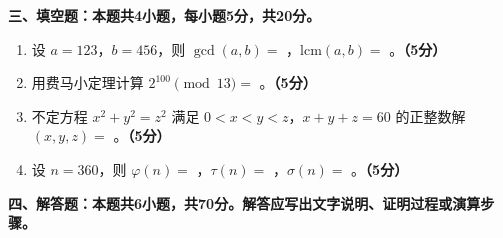 \documentclass[12pt, a4paper]{ctexart}
\newcommand{\score}[1]{\hfill\textbf{（#1分）}}
\begin{document}
\vspace{10pt}

{\large\bfseries 三、填空题：本题共4小题，每小题5分，共20分。}

\vspace{8pt}

\begin{enumerate}[resume]

\item 设 $a=123$，$b=456$，则 $\gcd(a,b)=$ \underline{\hspace{2cm}}，$\text{lcm}(a,b)=$ \underline{\hspace{2cm}}。\score{5}

\item 用费马小定理计算 $2^{100}\pmod{13}=$ \underline{\hspace{2cm}}。\score{5}

\item 不定方程 $x^2+y^2=z^2$ 满足 $0<x<y<z$，$x+y+z=60$ 的正整数解 $(x,y,z)=$ \underline{\hspace{2cm}}。\score{5}

\item 设 $n=360$，则 $\varphi(n)=$ \underline{\hspace{2cm}}，$\tau(n)=$ \underline{\hspace{2cm}}，$\sigma(n)=$ \underline{\hspace{2cm}}。\score{5}

\end{enumerate}

\vspace{10pt}

{\large\bfseries 四、解答题：本题共6小题，共70分。解答应写出文字说明、证明过程或演算步骤。}

\vspace{8pt}
\end{document}
